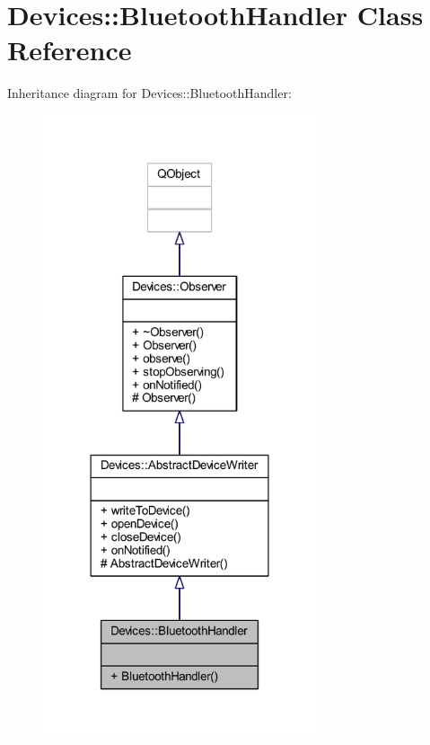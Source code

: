 \hypertarget{class_devices_1_1_bluetooth_handler}{}\section{Devices\+:\+:Bluetooth\+Handler Class Reference}
\label{class_devices_1_1_bluetooth_handler}


Inheritance diagram for Devices\+:\+:Bluetooth\+Handler\+:\nopagebreak
\begin{figure}[H]
\begin{center}
\leavevmode
\includegraphics[width=228pt]{d9/d7e/class_devices_1_1_bluetooth_handler__inherit__graph}
\end{center}
\end{figure}



